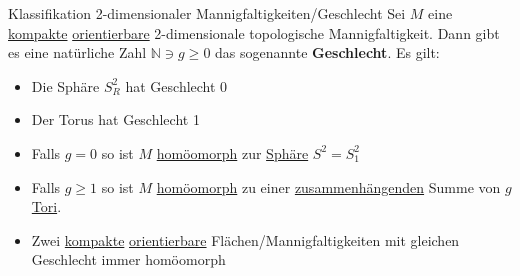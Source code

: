 \begin{titleDef}{Klassifikation 2-dimensionaler Mannigfaltigkeiten/Geschlecht}
\label{geschlecht}
Sei $M$ eine \hyperref[kompakt]{kompakte} \hyperref[orientierbar]{orientierbare} 2-dimensionale topologische Mannigfaltigkeit. Dann gibt es eine natürliche Zahl $\mathbb{N}\ni g\geq 0$ das sogenannte \textbf{Geschlecht}. Es gilt:
\begin{itemize}
	\item Die Sphäre $S^2_R$ hat Geschlecht 0
	\item Der Torus hat Geschlecht 1
	\item Falls $g=0$ so ist $M$ \hyperref[homoemorph]{homöomorph} zur \hyperref[sphere]{Sphäre} $S^2=S^2_1$
	\item Falls $g\geq1$ so ist $M$ \hyperref[homoemorph]{homöomorph} zu einer \hyperref[zusammenhang]{zusammenhängenden} Summe von $g$ \hyperref[torus]{Tori}.
	\item Zwei \hyperref[kompakt]{kompakte} \hyperref[orientierbar]{orientierbare} Flächen/Mannigfaltigkeiten mit gleichen Geschlecht immer homöomorph
\end{itemize}
\end{titleDef}